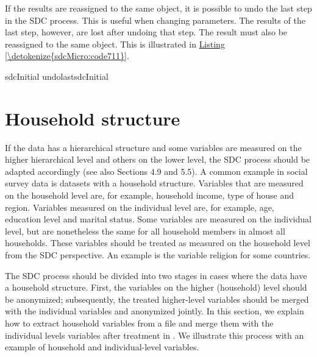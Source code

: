 \documentclass[letterpaper,10pt,english]{sphinxmanual}
\begin{document}
If the results are reassigned to the same  object, it is
possible to undo the last step in the SDC process. This is useful when
changing parameters. The results of the last step, however, are lost
after undoing that step.  The result must also be reassigned
to the same object. This is illustrated in \hyperref[\detokenize{sdcMicro:code711}]{Listing \ref{\detokenize{sdcMicro:code711}}}.

\def\sphinxLiteralBlockLabel{\label{\detokenize{sdcMicro:code711}}}
%
\begin{sphinxVerbatim}[commandchars=\\\{\},numbers=left,firstnumber=1,stepnumber=1]
     sdcInitial  undolastsdcInitial
\end{sphinxVerbatim}


\section{Household structure}
\label{\detokenize{sdcMicro:household-structure}}
If the data has a hierarchical structure and some variables are measured
on the higher hierarchical level and others on the lower level, the SDC
process should be adapted accordingly (see also Sections 4.9 and 5.5). A
common example in social survey data is datasets with a household
structure. Variables that are measured on the household level are, for
example, household income, type of house and region. Variables measured
on the individual level are, for example, age, education level and
marital status. Some variables are measured on the individual level, but
are nonetheless the same for all household members in almost all
households. These variables should be treated as measured on the
household level from the SDC perspective. An example is the variable
religion for some countries.

The SDC process should be divided into two stages in cases where the
data have a household structure. First, the variables on the higher
(household) level should be anonymized; subsequently, the treated
higher-level variables should be merged with the individual variables
and anonymized jointly. In this section, we explain how to extract
household variables from a file and merge them with the individual
levels variables after treatment in . We illustrate this process with
an example of household and individual-level variables.
\end{document}
